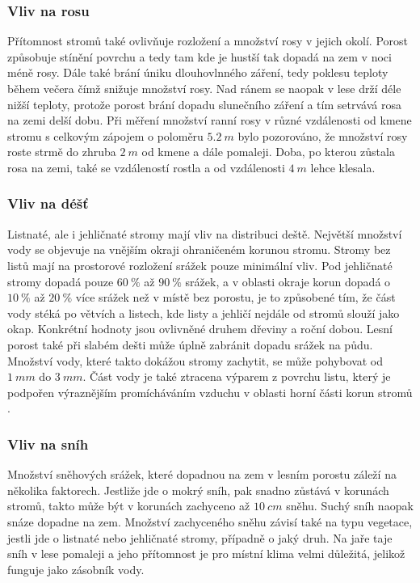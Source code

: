 \subsubsection{Vliv na rosu}
Přítomnost stromů také ovlivňuje rozložení a množství rosy v jejich okolí. Porost způsobuje stínění povrchu a tedy tam kde je hustší tak dopadá na zem v noci méně rosy. Dále také brání úniku dlouhovlnného záření, tedy poklesu teploty během večera čímž snižuje množství rosy. Nad ránem se naopak v lese drží déle nižší teploty, protože porost brání dopadu slunečního záření a tím setrvává rosa na zemi delší dobu. Při měření množství ranní rosy v různé vzdálenosti od kmene stromu s celkovým zápojem o poloměru $\SI{5.2}{m}$ bylo pozorováno, že množství rosy roste strmě do zhruba $\SI{2}{m}$ od kmene a dále pomaleji. Doba, po kterou zůstala rosa na zemi, také se vzdáleností rostla a od vzdálenosti $\SI{4}{m}$ lehce klesala\cite{alma}.

\subsubsection{Vliv na déšť}
Listnaté, ale i jehličnaté stromy mají vliv na distribuci deště. Největší množství vody se objevuje na vnějším okraji ohraničeném korunou stromu. Stromy bez listů mají na prostorové rozložení srážek pouze minimální vliv. Pod jehličnaté stromy dopadá pouze $\SI{60}{\%}$ až $\SI{90}{\%}$ srážek, a v oblasti okraje korun dopadá o $\SI{10}{\%}$ až $\SI{20}{\%}$ více srážek než v místě bez porostu, je to způsobené tím, že část vody stéká po větvích a listech, kde listy a jehličí nejdále od stromů slouží jako okap. Konkrétní hodnoty jsou ovlivněné druhem dřeviny a roční dobou. Lesní porost také při slabém dešti může úplně zabránit dopadu srážek na půdu. Množství vody, které takto dokážou stromy zachytit, se může pohybovat od $\SI{1}{mm}$ do $\SI{3}{mm}$. Část vody je také ztracena výparem z povrchu listu, který je podpořen výraznějším promícháváním vzduchu v oblasti horní části korun stromů \cite{alma}.

\subsubsection{Vliv na sníh}
Množství sněhových srážek, které dopadnou na zem v lesním porostu záleží na několika faktorech. Jestliže jde o mokrý sníh, pak snadno zůstává v korunách stromů, takto může být v korunách zachyceno až $\SI{10}{cm}$ sněhu. Suchý sníh naopak snáze dopadne na zem. Množství zachyceného sněhu závisí také na typu vegetace, jestli jde o listnaté nebo jehličnaté stromy, případně o jaký druh. Na jaře taje sníh v lese pomaleji a jeho přítomnost je pro místní klima velmi důležitá, jelikož funguje jako zásobník vody\cite{alma}.

